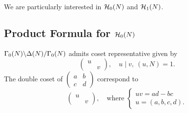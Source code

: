We are particularly interested in $\hecke_0(N)$ and $\hecke_1(N)$.

\subsection{Product Formula for $\hecke_0(N)$}

\begin{theorem}\label{coset representative of R0N}
    $\bico{\Delta(N)}{\Gamma_0(N)}{\Gamma_0(N)}$
    admits coset representative given by \[\begin{pmatrix}
        u &\\ & v
    \end{pmatrix},\quad u\mid v,\ (u, N) = 1.\]
    The double coset of $\begin{pmatrix}
        a &b\\c&d
    \end{pmatrix}$ correspond to\[\begin{pmatrix}
        u &\\ & v
    \end{pmatrix},\quad\text{where } \begin{cases}
        uv = ad - bc\\
        u = (a, b, c, d).
    \end{cases}\]
\end{theorem}

